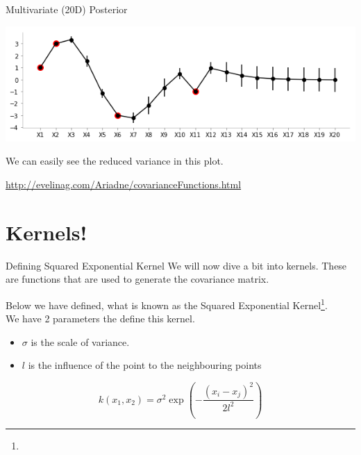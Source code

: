 \documentclass{beamer}
\begin{document}
	\begin{frame}{Multivariate (20D) Posterior}
		\begin{center}
			\includegraphics[width=\linewidth, height=\textheight -120pt ,keepaspectratio]{gp/20dcov} \\
		\end{center}
		We can easily see the reduced variance in this plot.
	\end{frame}
	
	\urldef\urlsek\url{http://evelinag.com/Ariadne/covarianceFunctions.html}
	\section{Kernels!}
	\begin{frame}{Defining Squared Exponential Kernel}
		We will now dive a bit into kernels. These are functions that are used to generate the covariance matrix.
		
		Below we have defined, what is known as the Squared Exponential Kernel\footnote{\urlsek}. \\
		
		We have 2 parameters the define this kernel.
		\begin{itemize}
			\item $\sigma$ is the scale of variance.
			\item $l$ is the influence of the point to the neighbouring points
		\end{itemize}
		
		$$
		k(x_1, x_2) = \sigma^2 \exp\left(-\frac{(x_i - x_j)^2}{2l^2}\right)
		$$
	\end{frame}
	
\end{document}
